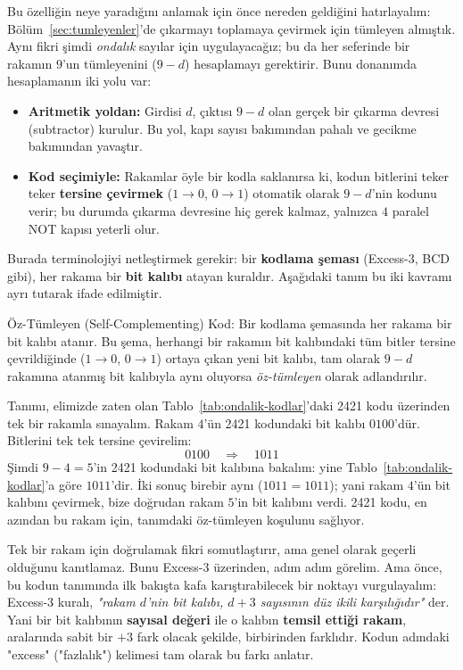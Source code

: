 Bu özelliğin neye yaradığını anlamak için önce nereden geldiğini hatırlayalım:
Bölüm~\ref{sec:tumleyenler}'de çıkarmayı toplamaya çevirmek için tümleyen almıştık. Aynı
fikri şimdi \emph{ondalık} sayılar için uygulayacağız; bu da her seferinde bir rakamın
$9$'un tümleyenini ($9-d$) hesaplamayı gerektirir. Bunu donanımda hesaplamanın iki yolu var:
\begin{itemize}[nosep, leftmargin=*]
    \item \textbf{Aritmetik yoldan:} Girdisi $d$, çıktısı $9-d$ olan gerçek bir çıkarma
    devresi (subtractor) kurulur. Bu yol, kapı sayısı bakımından pahalı ve gecikme
    bakımından yavaştır.
    \item \textbf{Kod seçimiyle:} Rakamlar öyle bir kodla saklanırsa ki, kodun bitlerini
    teker teker \textbf{tersine çevirmek} ($1\to0$, $0\to1$) otomatik olarak $9-d$'nin
    kodunu verir; bu durumda çıkarma devresine hiç gerek kalmaz, yalnızca $4$ paralel NOT
    kapısı yeterli olur.
\end{itemize}

Burada terminolojiyi netleştirmek gerekir: bir \textbf{kodlama şeması} (Excess-3, BCD gibi),
her rakama bir \textbf{bit kalıbı} atayan kuraldır. Aşağıdaki tanım bu iki kavramı ayrı
tutarak ifade edilmiştir.

\begin{tanim}{Öz-Tümleyen (Self-Complementing) Kod:}
Bir kodlama şemasında her rakama bir bit kalıbı atanır. Bu şema, herhangi bir rakamın bit
kalıbındaki tüm bitler tersine çevrildiğinde ($1\to0$, $0\to1$) ortaya çıkan yeni bit
kalıbı, tam olarak $9-d$ rakamına atanmış bit kalıbıyla aynı oluyorsa \emph{öz-tümleyen}
olarak adlandırılır.
\end{tanim}

\begin{ornek}
Tanımı, elimizde zaten olan Tablo~\ref{tab:ondalik-kodlar}'daki 2421 kodu üzerinden tek bir
rakamla sınayalım. Rakam $4$'ün 2421 kodundaki bit kalıbı $0100$'dür. Bitlerini tek tek
tersine çevirelim:
\[
0100 \quad\Rightarrow\quad 1011
\]
Şimdi $9-4=5$'in 2421 kodundaki bit kalıbına bakalım: yine Tablo~\ref{tab:ondalik-kodlar}'a
göre $1011$'dir. İki sonuç birebir aynı ($1011=1011$); yani rakam $4$'ün bit kalıbını
çevirmek, bize doğrudan rakam $5$'in bit kalıbını verdi. 2421 kodu, en azından bu rakam
için, tanımdaki öz-tümleyen koşulunu sağlıyor.
\end{ornek}

Tek bir rakam için doğrulamak fikri somutlaştırır, ama genel olarak geçerli olduğunu
kanıtlamaz. Bunu Excess-3 üzerinden, adım adım görelim. Ama önce, bu kodun
tanımında ilk bakışta kafa karıştırabilecek bir noktayı vurgulayalım: Excess-3 kuralı,
\emph{"rakam $d$'nin bit kalıbı, $d+3$ sayısının düz ikili karşılığıdır"} der. Yani bir bit
kalıbının \textbf{sayısal değeri} ile o kalıbın \textbf{temsil ettiği rakam}, aralarında
sabit bir $+3$ fark olacak şekilde, birbirinden farklıdır. Kodun adındaki "excess"
("fazlalık") kelimesi tam olarak bu farkı anlatır.

